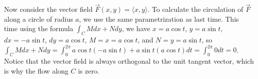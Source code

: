 \begin{example}
%
Now consider the vector field {$\vec F(x,y)=\langle x,y\rangle$}.  To calculate
  the circulation of {$\vec F$} along a circle of radius $a$, we use
  the same parametrization as last time. This time using the formula
  $\int_C Mdx+Ndy$, we have $x=a\cos t$, $y=a\sin t$, $dx=-a\sin t$,
  $dy=a\cos t$, $M=x=a\cos t$, and $N=y=a\sin t$, so $\int_C Mdx+Ndy =
  \int_0^{2\pi} a\cos t (-a\sin t) + a \sin t (a\cos t) dt = \int_0^{2\pi} 0 dt
  = 0$.  Notice that the vector field is always orthogonal to the unit
  tangent vector, which is why the flow along $C$ is zero.
\end{example}

